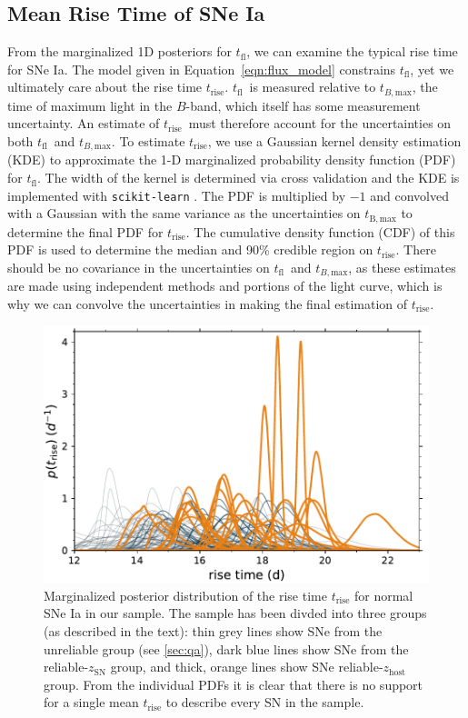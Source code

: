 \documentclass[twocolumn]{./aastex63}
\newcommand{\tfl}{$t_\mathrm{fl}$}
\newcommand{\trise}{$t_\mathrm{rise}$}
\newcommand{\tbmax}{$t_{B,\mathrm{max}}$}
\begin{document}
\subsection{Mean Rise Time of SNe Ia}\label{sec:mean_rise}

From the marginalized 1D posteriors for \tfl, we can examine the typical rise
time for SNe Ia. The model given in Equation~\ref{eqn:flux_model} constrains
\tfl, yet we ultimately care about the rise time \trise. \tfl\ is measured
relative to \tbmax, the time of maximum light in the $B$-band, which itself
has some measurement uncertainty. An estimate of \trise\ must therefore
account for the uncertainties on both \tfl\ and \tbmax. To estimate \trise,
we use a Gaussian kernel density estimation (KDE) to approximate the 1-D
marginalized probability density function (PDF) for \tfl. The width of the
kernel is determined via cross validation and the KDE is implemented with
\texttt{scikit-learn} \citep{Pedregosa11}. The PDF is multiplied by $-1$ and
convolved with a Gaussian with the same variance as the uncertainties on
$t_\mathrm{B,max}$ to determine the final PDF for \trise. The cumulative
density function (CDF) of this PDF is used to determine the median and 90\%
credible region on \trise. There should be no covariance in the uncertainties
on \tfl\ and \tbmax, as these estimates are made using independent methods
and portions of the light curve, which is why we can convolve the
uncertainties in making the final estimation of \trise.

\begin{figure}
    \centering
    \includegraphics[width=1\linewidth]{./figures/rise_time.pdf}
    \caption{Marginalized posterior distribution of the rise time
    $t_\mathrm{rise}$ for normal SNe Ia in our sample. The sample has been
    divded into three groups (as described in the text): thin grey lines show
    SNe from the unreliable group (see \ref{sec:qa}), dark blue lines show
    SNe from the reliable-$z_\mathrm{SN}$ group, and thick, orange lines show
    SNe reliable-$z_\mathrm{host}$ group. From the individual PDFs it is
    clear that there is no support for a single mean $t_\mathrm{rise}$ to
    describe every SN in the sample.}
    \label{fig:rise_time}
\end{figure}
\end{document}
